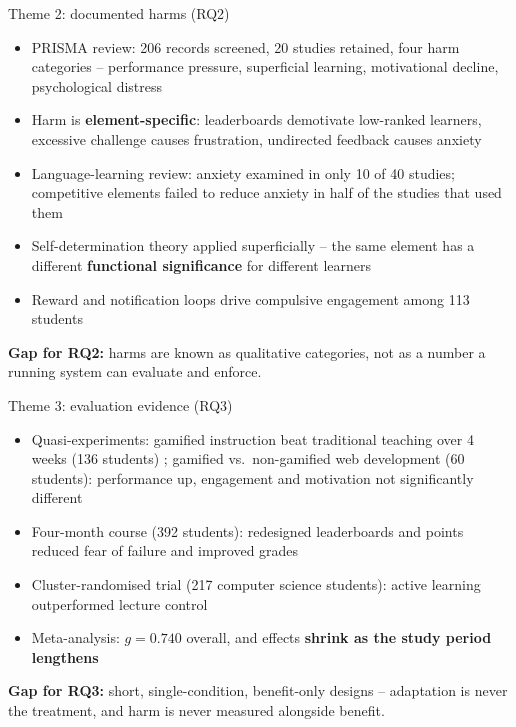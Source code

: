 \documentclass[10pt]{beamer}
\begin{document}
\begin{frame}{Theme 2: documented harms (RQ2)}
\begin{itemize}
    \item PRISMA review: 206 records screened, 20 studies retained, four harm categories --
    performance pressure, superficial learning, motivational decline, psychological distress
    \cite{nugroho2025negative}
    \item Harm is \textbf{element-specific}: leaderboards demotivate low-ranked learners,
    excessive challenge causes frustration, undirected feedback causes anxiety
    \item Language-learning review: anxiety examined in only 10 of 40 studies; competitive
    elements failed to reduce anxiety in half of the studies that used them \cite{edwards2022anxiety}
    \item Self-determination theory applied superficially -- the same element has a different
    \textbf{functional significance} for different learners \cite{gao2024sdt}
    \item Reward and notification loops drive compulsive engagement among 113 students
    \cite{gul2026brainrot}
\end{itemize}
\vspace{0.1cm}
\begin{keybox}
\textbf{Gap for RQ2:} harms are known as qualitative categories, not as a number a running
system can evaluate and enforce.
\end{keybox}
\end{frame}

\begin{frame}{Theme 3: evaluation evidence (RQ3)}
\begin{itemize}
    \item Quasi-experiments: gamified instruction beat traditional teaching over 4 weeks
    (136 students) \cite{zhang2026gamification}; gamified vs.\ non-gamified web development
    (60 students): performance up, engagement and motivation not significantly different
    \cite{ojonuba2025web}
    \item Four-month course (392 students): redesigned leaderboards and points reduced fear of
    failure and improved grades \cite{durmaz2022gamification}
    \item Cluster-randomised trial (217 computer science students): active learning outperformed
    lecture control \cite{lopezfernandez2024lego}
    \item Meta-analysis: $g = 0.740$ overall, and effects \textbf{shrink as the study period
    lengthens} \cite{lu2024ai,ming2025gamification}
\end{itemize}
\vspace{0.1cm}
\begin{keybox}
\textbf{Gap for RQ3:} short, single-condition, benefit-only designs -- adaptation is never the
treatment, and harm is never measured alongside benefit.
\end{keybox}
\end{frame}
\end{document}
